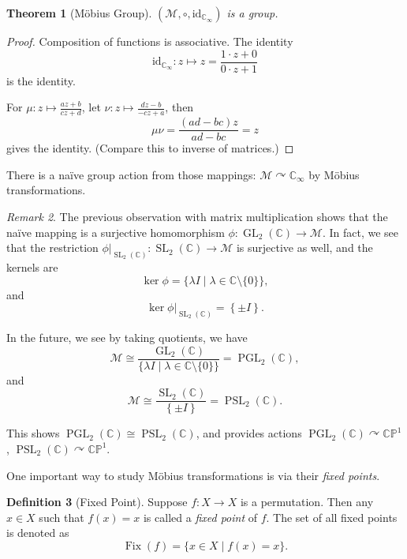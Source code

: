 \documentclass{article}
\newtheorem{theorem}{Theorem}[section]
\theoremstyle{definition}
\newtheorem{definition}[theorem]{Definition}
\theoremstyle{remark}
\newtheorem{remark}[theorem]{Remark}
\newcommand{\pqty}[1]{\left(#1\right)}
\newcommand{\Bqty}[1]{\left\{#1\right\}}
\newcommand{\set}[2]{\{#1\mid #2\}}
\newcommand{\flatfrac}[2]{\frac{#1}{#2}}
\newcommand{\functiondomain}[3]{#1:#2\to #3}
\newcommand{\functionmap}[3]{#1:#2\mapsto #3}
\newcommand{\isomorphic}{\cong}
\newcommand{\actson}{\curvearrowright}
\newcommand{\identity}{\mathrm{id}}
\newcommand{\CC}{\mathbb{C}}
\newcommand{\GL}{\operatorname{GL}}
\newcommand{\SL}{\operatorname{SL}}
\newcommand{\rightbar}[1]{\left.#1\right|}
\newcommand{\compactify}{_{\infty}}
\newcommand{\CP}{\mathbb{CP}}
\newcommand{\mobius}{\mathcal{M}}
\newcommand{\identityM}{I}
\newcommand{\Fix}{\operatorname{Fix}}
\newcommand{\PGL}{\operatorname{PGL}}
\newcommand{\PSL}{\operatorname{PSL}}
\begin{document}
\begin{theorem}[M\"{o}bius Group]
    \label{thm:mobius-group}%
    \(\pqty{\mobius, \circ, \identity_{\CC\compactify}}\) is a group.
\end{theorem}

\begin{proof}
    Composition of functions is associative. The identity
    \[
        \functionmap{\identity_{\CC\compactify}}{z}{z = \frac{1 \cdot z + 0}{0 \cdot z + 1}}
    \]
    is the identity.

    For \(\functionmap{\mu}{z}{\frac{az + b}{cz + d}}\), let \(\functionmap{\nu}{z}{\frac{dz - b}{-cz + a}}\), then
    \[
        \mu \nu = \frac{\pqty{ad - bc}{z}}{ad - bc} = z
    \]
    gives the identity. (Compare this to inverse of matrices.)
\end{proof}

There is a na\"{i}ve group action from those mappings: \(\mobius \actson \CC\compactify\) by M\"{o}bius transformations.

\begin{remark}
    The previous observation with matrix multiplication shows that the na\"{i}ve mapping is a surjective homomorphism \(\functiondomain{\phi}{\GL_{2} \pqty{\CC}}{\mobius}\). In fact, we see that the restriction \(\functiondomain{\rightbar{\phi}_{\SL_{2} \pqty{\CC}}}{\SL_{2} \pqty{\CC}}{\mobius}\) is surjective as well, and the kernels are
    \[
        \ker \phi = \set{\lambda \identityM}{\lambda \in \CC\setminus\{0\}},
    \]
    and
    \[
        \ker \rightbar{\phi}_{\SL_{2} \pqty{\CC}} = \Bqty{\pm \identityM}.
    \]

    In the future, we see by taking quotients, we have
    \[
        \mobius \isomorphic \flatfrac{\GL_{2}\pqty{\CC}}{\set{\lambda \identityM}{\lambda \in \CC\setminus\{0\}}} = \PGL_{2} \pqty{\CC},
    \]
    and
    \[
        \mobius \isomorphic \flatfrac{\SL_{2}\pqty{\CC}}{\Bqty{\pm \identityM}} = \PSL_{2} \pqty{\CC}.
    \]

    This shows \(\PGL_{2} \pqty{\CC} \isomorphic \PSL_{2} \pqty{\CC}\), and provides actions \(\PGL_{2} \pqty{\CC} \actson \CP^{1}\), \(\PSL_{2} \pqty{\CC} \actson \CP^{1}\).
\end{remark}

One important way to study M\"{o}bius transformations is via their \emph{fixed points}.

\begin{definition}[Fixed Point]
    \label{def:fixed-point}%
    Suppose \(\functiondomain{f}{X}{X}\) is a permutation. Then any \(x \in X\) such that \(f\pqty{x} = x\) is called a \emph{fixed point} of \(f\). The set of all fixed points is denoted as
    \[
        \Fix\pqty{f} = \set{x \in X}{f\pqty{x} = x}.
    \]
\end{definition}
\end{document}
